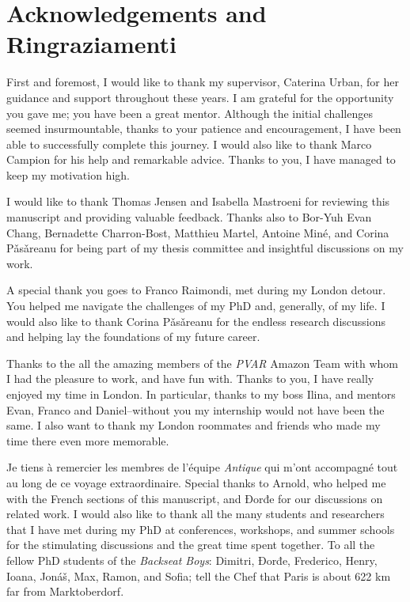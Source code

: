 \chapter*{Acknowledgements and Ringraziamenti}


First and foremost, I would like to thank my supervisor, Caterina Urban, for her guidance and support throughout these years. I am grateful for the opportunity you gave me; you have been a great mentor.
Although the initial challenges seemed insurmountable, thanks to your patience and encouragement,
I have been able to successfully complete this journey.
I would also like to thank Marco Campion for his help and remarkable advice. Thanks to you, I have managed to keep my motivation high.

I would like to thank Thomas Jensen and Isabella Mastroeni for reviewing this manuscript and providing valuable feedback. Thanks also to Bor-Yuh Evan Chang, Bernadette Charron-Bost, Matthieu Martel, Antoine Miné, and Corina Pǎsǎreanu for being part of my thesis committee and insightful discussions on my work.

A special thank you goes to Franco Raimondi, met during my London detour. You helped me navigate the challenges of my PhD and, generally, of my life.
I would also like to thank Corina Pǎsǎreanu for the endless research discussions and helping lay the foundations of my future career.

Thanks to the all the amazing members of the \emph{PVAR} Amazon Team with whom I had the pleasure to work, and have fun with.
Thanks to you, I have really enjoyed my time in London.
In particular, thanks to my boss Ilina, and mentors Evan, Franco and Daniel--without you my internship would not have been the same. I also want to thank my London roommates and friends who made my time there even more memorable.

Je tiens à remercier les membres de l'équipe \emph{Antique} qui m'ont accompagné tout au long de ce voyage extraordinaire. Special thanks to Arnold, who helped me with the French sections of this manuscript, and Đorđe for our discussions on related work. I would also like to thank all the many students and researchers that I have met during my PhD at conferences, workshops, and summer schools for the stimulating discussions and the great time spent together. To all the fellow PhD students of the \emph{Backseat Boys}:
Dimitri,
Đorđe,
Frederico,
Henry,
Ioana,
Jonáš,
Max,
Ramon, and
Sofia; tell the Chef that Paris is about 622 km far from Marktoberdorf.


